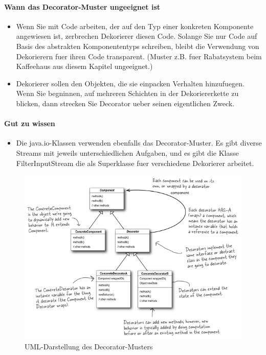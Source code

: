 \paragraph{Wann das Decorator-Muster ungeeignet ist}
\begin{itemize}
\item Wenn Sie mit Code arbeiten, der auf den Typ einer konkreten Komponente angewiesen ist, 
  zerbrechen Dekorierer diesen Code. Solange Sie nur Code auf Basis des abstrakten 
  Komponententyps schreiben, bleibt die Verwendung von Dekorierern fuer ihren Code transparent.
  (Muster z.B. fuer Rabatsystem beim Kaffeehaus aus diesem Kapitel ungeeignet.)
\item Dekorierer sollen den Objekten, die sie einpacken Verhalten hinzufuegen. Wenn Sie begninnen, 
  auf mehreren Schichten in der Dekoriererkette zu blicken, dann strecken Sie Decorator ueber 
  seinen eigentlichen Zweck.
\end{itemize}
  
\paragraph{Gut zu wissen}
\begin{itemize}
\item Die java.io-Klassen verwenden ebenfalls das Decorator-Muster. Es gibt diverse Streams mit 
  jeweils unterschiedlichen Aufgaben, und es gibt die Klasse FilterInputStream die als Superklasse 
  fuer verschiedene Dekorierer arbeitet.
\end{itemize}

\begin{figure}
	\centering
	\includegraphics{decorator/img/decoratorUML}
	\caption{UML-Darstellung des Decorator-Musters}
	\label{fig:decoratorUML}
\end{figure}
